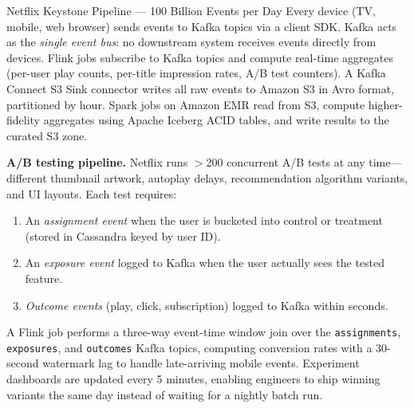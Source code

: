 \begin{casestudy}{Netflix Keystone Pipeline --- 100 Billion Events per Day}
\medskip
Every device (TV, mobile, web browser) sends events to Kafka topics via
a client SDK. Kafka acts as the \emph{single event bus}: no downstream
system receives events directly from devices. Flink jobs subscribe to
Kafka topics and compute real-time aggregates (per-user play counts,
per-title impression rates, A/B test counters). A Kafka Connect S3
Sink connector writes all raw events to Amazon S3 in Avro format,
partitioned by hour. Spark jobs on Amazon EMR read from S3, compute
higher-fidelity aggregates using Apache Iceberg ACID tables, and
write results to the curated S3 zone.

\medskip
\textbf{A/B testing pipeline.} Netflix runs $>$200 concurrent A/B tests
at any time---different thumbnail artwork, autoplay delays, recommendation
algorithm variants, and UI layouts. Each test requires:
\begin{enumerate}
  \item An \emph{assignment event} when the user is bucketed into control
        or treatment (stored in Cassandra keyed by user ID).
  \item An \emph{exposure event} logged to Kafka when the user actually
        sees the tested feature.
  \item \emph{Outcome events} (play, click, subscription) logged to
        Kafka within seconds.
\end{enumerate}
A Flink job performs a three-way event-time window join over the
\texttt{assignments}, \texttt{exposures}, and \texttt{outcomes} Kafka
topics, computing conversion rates with a 30-second watermark lag to
handle late-arriving mobile events. Experiment dashboards are updated
every 5 minutes, enabling engineers to ship winning variants the same day
instead of waiting for a nightly batch run.


\end{casestudy}
